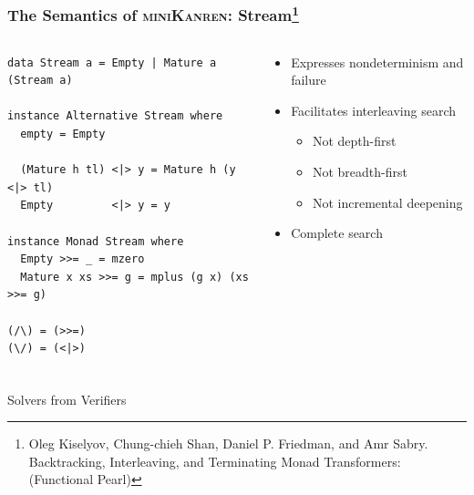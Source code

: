 \documentclass[xcolor={dvipsnames}, aspectratio=169]{beamer}
\newcommand{\mk}{\textsc{miniKanren}\xspace}
\begin{document}
\begin{frame}[fragile]
  \frametitle{The Semantics of \mk: Stream\footnote{Oleg Kiselyov, Chung-chieh Shan, Daniel P. Friedman, and Amr Sabry. Backtracking, Interleaving,
  and Terminating Monad Transformers: (Functional Pearl)}}


  \begin{columns}
    \begin{column}{0.55\textwidth}
      \begin{lstlisting}[language=ocanren]
data Stream a = Empty | Mature a (Stream a) 

instance Alternative Stream where
  empty = Empty

  (Mature h tl) <|> y = Mature h (y <|> tl)
  Empty         <|> y = y

instance Monad Stream where
  Empty >>= _ = mzero
  Mature x xs >>= g = mplus (g x) (xs >>= g)

(/\) = (>>=)
(\/) = (<|>)
    \end{lstlisting}             
    \end{column}
    
    \begin{column}{0.45\textwidth}
\begin{itemize}
  \item Expresses nondeterminism and failure
  \item Facilitates interleaving search 
  \begin{itemize}
    \item Not depth-first
    \item Not breadth-first
    \item Not incremental deepening
  \end{itemize}
  \item Complete search
\end{itemize}
    \end{column}
  \end{columns}


\end{frame}

\begin{frame}[fragile]
  \frametitle{}

\begin{center}
  \Large Solvers from Verifiers
\end{center}

\end{frame}
\end{document}
